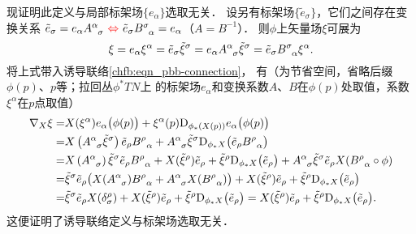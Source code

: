 现证明此定义与局部标架场$\{e_\alpha\}$选取无关．
设另有标架场$\{\tilde{e}_{\sigma}\}$，它们之间存在变换关系
$\tilde{e}_\sigma= e_\alpha A^\alpha_{\hphantom{\alpha}\sigma} {\  \color{red}\Leftrightarrow\  } 
\tilde{e}_\sigma B_{\hphantom{\alpha}\alpha}^\sigma  = e_\alpha$（$A=B^{-1}$）．
则$\phi$上矢量场$\xi$可展为
\begin{equation}
    \xi = e_\alpha \xi^\alpha = \tilde{e}_\sigma \tilde{\xi}^\sigma
    = e_\alpha A^\alpha_{\hphantom{\alpha}\sigma} \tilde{\xi}^\sigma
    = \tilde{e}_\sigma B_{\hphantom{\alpha}\alpha}^\sigma \xi^\alpha .
\end{equation}
将上式带入诱导联络\eqref{chfb:eqn_pbb-connection}，
有（为节省空间，省略后缀$\phi(p)$、$p$等；拉回丛$\phi^*TN$上
的标架场$e_\alpha$和变换系数$A$、$B$在$\phi(p)$处取值，系数$\xi^\alpha$在$p$点取值）
\begin{align*}
    \nabla_X \xi =& X(\xi^\alpha ) e_\alpha\bigl(\phi(p)\bigr)
    +\xi^\alpha(p) \mathrm{D}_{\phi_*(X(p))} e_\alpha\bigl(\phi(p)\bigr) \\
    =& X\left(A^\alpha_{\hphantom{\alpha}\sigma} \tilde{\xi}^\sigma \right) 
    \tilde{e}_\rho B_{\hphantom{\alpha}\alpha}^\rho
    + A^\alpha_{\hphantom{\alpha}\sigma} \tilde{\xi}^\sigma 
    \mathrm{D}_{\phi_*X} \bigl(\tilde{e}_\rho B_{\hphantom{\alpha}\alpha}^\rho\bigr) \\
    =& X\left(A^\alpha_{\hphantom{\alpha}\sigma}  \right) \tilde{\xi}^\sigma
    \tilde{e}_\rho B_{\hphantom{\alpha}\alpha}^\rho
    + X ( \tilde{\xi}^\rho ) \tilde{e}_\rho 
    +  \tilde{\xi}^\rho  \mathrm{D}_{\phi_*X} \bigl(\tilde{e}_\rho \bigr) 
    + A^\alpha_{\hphantom{\alpha}\sigma} \tilde{\xi}^\sigma \tilde{e}_\rho 
    X( B_{\hphantom{\alpha}\alpha}^\rho \circ \phi ) \\
    =& \tilde{\xi}^\sigma \tilde{e}_\rho \bigl(
    X(A^\alpha_{\hphantom{\alpha}\sigma}  ) B_{\hphantom{\alpha}\alpha}^\rho
    + A^\alpha_{\hphantom{\alpha}\sigma} X( B_{\hphantom{\alpha}\alpha}^\rho ) \bigr)
    + X ( \tilde{\xi}^\rho ) \tilde{e}_\rho 
    +  \tilde{\xi}^\rho  \mathrm{D}_{\phi_*X} \bigl(\tilde{e}_\rho \bigr)   \\
    =& \tilde{\xi}^\sigma \tilde{e}_\rho  X( \delta^\rho_\sigma )+
    X ( \tilde{\xi}^\rho ) \tilde{e}_\rho 
    +  \tilde{\xi}^\rho  \mathrm{D}_{\phi_*X} \bigl(\tilde{e}_\rho \bigr)
    =X ( \tilde{\xi}^\rho ) \tilde{e}_\rho 
    +  \tilde{\xi}^\rho  \mathrm{D}_{\phi_*X} \bigl(\tilde{e}_\rho \bigr) .
\end{align*}
这便证明了诱导联络定义与标架场选取无关．


